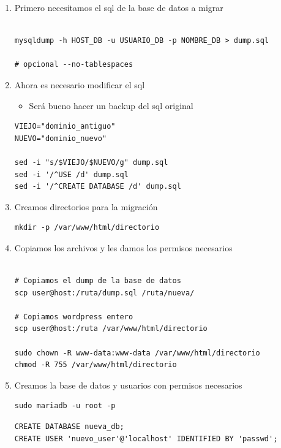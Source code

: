 \documentclass[11pt]{article}
\begin{document}
\begin{enumerate}
\item Primero necesitamos el sql de la base de datos a migrar

\begin{verbatim}

mysqldump -h HOST_DB -u USUARIO_DB -p NOMBRE_DB > dump.sql

# opcional --no-tablespaces

\end{verbatim}

\item Ahora es necesario modificar el sql

\begin{itemize}
\item Será bueno hacer un backup del sql original
\end{itemize}

\begin{verbatim}
VIEJO="dominio_antiguo"
NUEVO="dominio_nuevo"

sed -i "s/$VIEJO/$NUEVO/g" dump.sql
sed -i '/^USE /d' dump.sql
sed -i '/^CREATE DATABASE /d' dump.sql
\end{verbatim}

\item Creamos directorios para la migración

\begin{verbatim}
mkdir -p /var/www/html/directorio
\end{verbatim}

\item Copiamos los archivos y les damos los permisos necesarios

\begin{verbatim}

# Copiamos el dump de la base de datos
scp user@host:/ruta/dump.sql /ruta/nueva/

# Copiamos wordpress entero
scp user@host:/ruta /var/www/html/directorio

sudo chown -R www-data:www-data /var/www/html/directorio
chmod -R 755 /var/www/html/directorio
\end{verbatim}

\item Creamos la base de datos y usuarios con permisos necesarios

\begin{verbatim}
sudo mariadb -u root -p
\end{verbatim}

\begin{verbatim}
CREATE DATABASE nueva_db;
CREATE USER 'nuevo_user'@'localhost' IDENTIFIED BY 'passwd';


\end{verbatim}
\end{enumerate}
\end{document}
